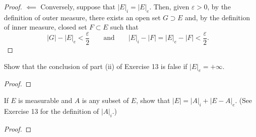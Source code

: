\begin{proof}
$\impliedby$ Conversely, suppose that
$\left|E\right|_i=\left|E\right|_e$. Then, given $\varepsilon>0$, by the
definition of outer measure, there exists an open set $G\supset E$ and, by
the definition of inner measure, closed set $F\subset E$ such that
\begin{equation}
  \label{eq:inner-outer-approximation}
\left|G\right|-\left|E\right|_e<\frac{\varepsilon}{2}\qquad\text{and}\qquad
\left|E\right|_i-\left|F\right|=
\left|E\right|_e-\left|F\right|<\frac{\varepsilon}{2}.
\end{equation}

\end{proof}
\newpage

\begin{problem}
  Show that the conclusion of part (ii) of Exercise 13 is false if
  $\left|E\right|_e=+\infty$.
\end{problem}
\begin{proof}
\end{proof}
\newpage


\begin{problem}
If $E$ is measurable and $A$ is any subset of $E$, show that
$\left|E\right|=\left|A\right|_i+\left|E-A\right|_e$. (See Exercise 13 for
the definition of $\left|A\right|_i$.)
\end{problem}
\begin{proof}
\end{proof}

